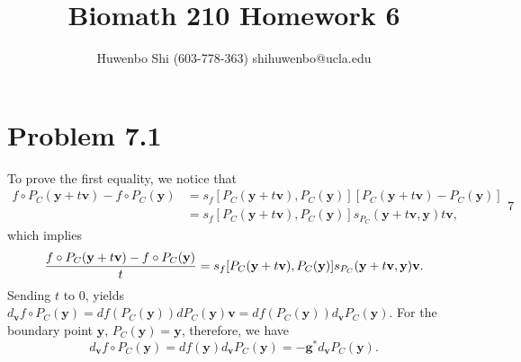 \documentclass{scrartcl}
\begin{document}

\newcommand*{\TitleFont}{
      \usefont{\encodingdefault}{\rmdefault}{b}{n}
      \fontsize{16}{20}
      \selectfont}
\newcommand*{\AuthorFont}{
      \usefont{\encodingdefault}{\rmdefault}{r}{n}
      \fontsize{12}{20}
      \selectfont}
\title{\TitleFont Biomath 210 Homework 6}
\author{\AuthorFont Huwenbo Shi (603-778-363) shihuwenbo@ucla.edu}
\maketitle

\newcommand*{\argmin}{\operatornamewithlimits{argmin}\limits}
\newcommand*{\argmax}{\operatornamewithlimits{argmax}\limits}
\newcommand{\tr}{\mathrm{tr}}
\newcommand{\dom}{\mathrm{dom}}
\newcommand{\E}{\mathrm{E}}
\newcommand{\prox}{\mathrm{prox}}
\newcommand{\epi}{\mathrm{epi}}
\def\mb#1{\mathbf{#1}}


\section*{Problem 7.1}

To prove the first equality, we notice that
\begin{equation}
\begin{split}
f \circ P_C (\mb{y}+t\mb{v}) - f \circ P_C(\mb{y})
& = s_{f}[P_C(\mb{y}+t\mb{v}), P_C(\mb{y})] [P_C(\mb{y}+t\mb{v}) - P_C(\mb{y})] \\
& = s_{f}[P_C(\mb{y}+t\mb{v}), P_C(\mb{y})] s_{P_C}(\mb{y}+t\mb{v}, \mb{y}) t\mb{v},
\end{split}7
\end{equation}
which implies
\begin{equation}
{{f \circ P_C (\mb{y}+t\mb{v}) - f \circ P_C(\mb{y})} \over t }
= s_{f}[P_C(\mb{y}+t\mb{v}), P_C(\mb{y})] s_{P_C}(\mb{y}+t\mb{v}, \mb{y}) \mb{v}.
\label{eqn:derv_def}
\end{equation}
Sending $t$ to 0, yields
$d_{\mb{v}} f \circ P_C(\mb{y}) = df (P_C(\mb{y})) d{P_C}(\mb{y}) \mb{v} = df (P_C(\mb{y})) d_{\mb{v}}{P_C}(\mb{y})$.
For the boundary point $\mb{y}$, $P_C(\mb{y}) = \mb{y}$, therefore, we have  
\begin{equation}
d_{\mb{v}} f \circ P_C(\mb{y}) = df (\mb{y}) d_{\mb{v}}{P_C}(\mb{y}) = -\mb{g}^*d_{\mb{v}}{P_C}(\mb{y}).
\end{equation}
\end{document}
